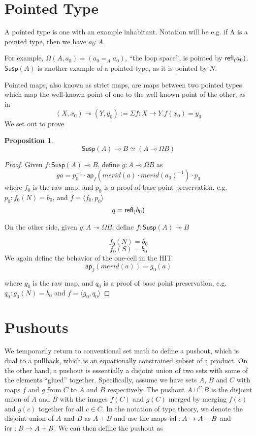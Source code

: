 \documentclass[11pt]{article}
\newcommand{\lolli}{\multimap}
\newcommand*{\ap}{\mathsf{ap}}
\newcommand{\susp}[1]{\mathsf{Susp}(#1)}
\newtheorem{proposition}{Proposition}
\begin{document}
\section{Pointed Type}
A pointed type is one with an example inhabitant. Notation will be e.g. if A is a pointed type, then we have $a_0 : A$.

For example, $\Omega(A, a_0) = (a_0 =_A a_0)$, ``the loop space'', is pointed by $\mathsf{refl}_{(} a_0)$. $\susp{A}$ is another example of a pointed type, as it is pointed by $N$.

Pointed maps, also known as strict maps, are maps between two pointed types which map the well-known point of one to the well known point of the other, as in
$$(X, x_0) \lolli (Y, y_0) := \Sigma f : X \to Y . f(x_0) = y_0$$
We set out to prove
\begin{proposition}
$$\susp{A} \lolli B \simeq (A \lolli \Omega B)$$
\end{proposition}
\begin{proof}
Given $f : \susp{A} \lolli B$, define $g : A \lolli \Omega B$ as
$$g a = p_0^{-1} \cdot \ap_f(merid(a) \cdot merid(a_0)^{-1}) \cdot p_0$$
where $f_0$ is the raw map, and $p_0$ is a proof of base point preservation, e.g. $p_0 : f_0(N) = b_0$, and $f = \langle f_0, p_0\rangle$
$$q = \mathsf{refl}_{(} b_0)$$

On the other side, given $g : A \lolli \Omega B$, define $f : \susp{A} \lolli B$

$$f_0(N) = b_0$$
$$f_0(S) = b_0$$
We again define the behavior of the one-cell in the HIT
$$\ap_f(merid(a)) = g_0(a)$$

where $g_0$ is the raw map, and $q_0$ is a proof of base point preservation, e.g. $q_0 : g_0(N) = b_0$ and $f = \langle g_0, q_0\rangle$
\end{proof}

\section{Pushouts}
We temporarily return to conventional set math to define a pushout, which is
dual to a pullback, which is an equationally constrained subset of a product.
On the other hand, a pushout is essentially a disjoint union of two sets 
with some of the elements ``glued'' together. Specifically, assume we have
sets $A$, $B$ and $C$ with maps $f$ and $g$ from $C$ to $A$ and $B$ 
respectively. The pushout 
$A \sqcup^C B$ is the disjoint union of $A$ and $B$ with the images $f(C)$ and
$g(C)$ merged by merging $f(c)$ and $g(c)$ together for all $c \in C$. In the
notation of type theory, we denote the disjoint union of $A$ and $B$ as 
$A + B$ and use the maps ${\mathsf{inl}}: A \to A + B$ and ${\mathsf{inr}}: B \to A + B$. We
can then define the pushout as
\end{document}
